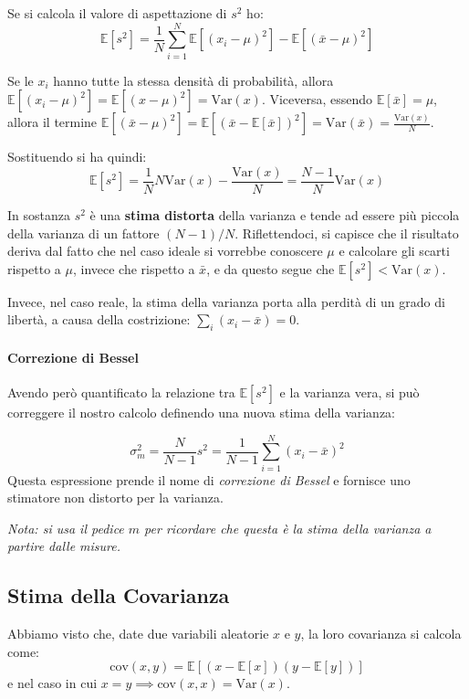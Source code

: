 \documentclass[openany,a4paper,12pt]{book}
\theoremstyle{remark}
\begin{document}
Se si calcola il valore di aspettazione di $s^2$ ho:
\begin{equation}
\mathbb{E}[s^2] = \frac{1}{N} \sum_{i=1}^N \mathbb{E}\left[(x_i - \mu)^2\right] - \mathbb{E}\left[(\bar{x} - \mu)^2\right]
\end{equation}

Se le $x_i$ hanno tutte la stessa densità di probabilità, allora $\mathbb{E}[(x_i - \mu)^2] = \mathbb{E}[(x - \mu)^2] = \text{Var}(x)$. Viceversa, essendo $\mathbb{E}[\bar{x}] = \mu$, allora il termine $\mathbb{E}[(\bar{x} - \mu)^2] = \mathbb{E}[(\bar{x} - \mathbb{E}[\bar{x}])^2] = \text{Var}(\bar{x}) = \frac{\text{Var}(x)}{N}$.

Sostituendo si ha quindi:
\begin{equation}
\mathbb{E}[s^2] = \frac{1}{N} N \text{Var}(x) - \frac{\text{Var}(x)}{N} = \frac{N-1}{N} \text{Var}(x)
\end{equation}

In sostanza $s^2$ è una \textbf{stima distorta} della varianza e tende ad essere più piccola della varianza di un fattore $(N-1)/N$.
Riflettendoci, si capisce che il risultato deriva dal fatto che nel caso ideale si vorrebbe conoscere $\mu$ e calcolare gli scarti rispetto a $\mu$, invece che rispetto a $\bar{x}$, e da questo segue che $\mathbb{E}[s^2] < \text{Var}(x)$.

Invece, nel caso reale, la stima della varianza porta alla perdità di un grado di libertà, a causa della costrizione: $\sum_i (x_i - \bar{x}) = 0$.

\paragraph{Correzione di Bessel}
Avendo però quantificato la relazione tra $\mathbb{E}[s^2]$ e la varianza vera, si può correggere il nostro calcolo definendo una nuova stima della varianza:


\begin{equation}
\sigma_m^2 = \frac{N}{N-1} s^2 = \frac{1}{N-1} \sum_{i=1}^N (x_i - \bar{x})^2
\end{equation}
Questa espressione prende il nome di \emph{correzione di Bessel} e fornisce uno stimatore non distorto per la varianza.

\emph{Nota: si usa il pedice $m$ per ricordare che questa è la stima della varianza a partire dalle misure.}

\subsection*{Stima della Covarianza}
Abbiamo visto che, date due variabili aleatorie $x$ e $y$, la loro covarianza si calcola come:
\begin{equation}
\text{cov}(x,y) = \mathbb{E}\left[ (x - \mathbb{E}[x])(y - \mathbb{E}[y]) \right]
\end{equation}
e nel caso in cui $x=y \implies \text{cov}(x,x) = \text{Var}(x)$.
\end{document}
